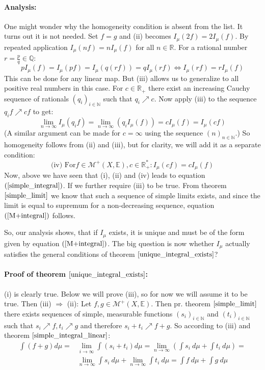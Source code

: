 \documentclass[12pt, a4paper]{article}
\numberwithin{equation}{section}
\begin{document}
\paragraph{Analysis:}
One might wonder why the homogeneity condition is absent from the list. It turns out it is not needed. Set $f=g$ and (ii) becomes $I_\mu(2f)=2 I_\mu(f)$. By repeated application $I_\mu(nf)=n I_\mu(f)$ for all $n\in\mathbb{R}$. For a rational number $r=\frac{p}{q}\in\mathbb{Q}$:
\begin{equation}
p I_\mu(f)=I_\mu(pf)=I_\mu(q(rf))=q I_\mu(rf)\Leftrightarrow I_\mu(rf)=r I_\mu(f)
\end{equation}
This can be done for any linear map. But (iii) allows us to generalize to all positive real numbers in this case. For $c\in\mathbb{R}_+$ there exist an increasing Cauchy sequence of rationals $(q_i)_{i\in\mathbb{N}}$ such that $q_i\nearrow c$. Now apply (iii) to the sequence $q_i f\nearrow c f$ to get:
\begin{equation}
\lim_{n\rightarrow\infty}I_\mu(q_i f)=\lim_{n\rightarrow\infty}\left(q_i I_\mu(f)\right)=c I_\mu(f)=I_\mu(c f)
\end{equation}
(A similar argument can be made for $c=\infty$ using the sequence $(n)_{n\in\mathbb{N}}$.) So homogeneity follows from (ii) and (iii), but for clarity, we will add it as a separate condition:
\begin{equation}
\label{lebesgue_integral_homogeneity}
\textrm{(iv) For} f\in\mathcal{M}^+(X,\mathbb{E}), c\in\mathbb{R}^*_+: I_\mu(c f)=c I_\mu(f)
\end{equation}
Now, above we have seen that (i), (ii) and (iv) leads to equation $(\ref{simple_integral})$. If we further require (iii) to be true. From theorem $\ref{simple_limit}$ we know that such a sequence of simple limits exists, and since the limit is equal to supremum for a non-decreasing sequence, equation $(\ref{M+integral})$ follows.

So, our analysis shows, that if $I_\mu$ exists, it is unique and must be of the form given by equation $(\ref{M+integral})$. The big question is now whether $I_\mu$ actually satisfies the general conditions of theorem $\ref{unique_integral_exists}$?

\paragraph{Proof of theorem $\ref{unique_integral_exists}$:}
(i) is clearly true. Below we will prove (iii), so for now we will assume it to be true. Then (iii) $\Rightarrow$ (ii): Let $f,g\in\mathcal{M}^+(X,\mathbb{E})$. Then pr. theorem $\ref{simple_limit}$ there exists sequences of simple, measurable functions $(s_i)_{i\in\mathbb{N}}$ and $(t_i)_{i\in\mathbb{N}}$ such that $s_i\nearrow f, t_i\nearrow g$ and therefore $s_i+t_i\nearrow f+g$. So according to (iii) and theorem $\ref{simple_integral_linear}$:
\begin{align}
\int(f+g)d\mu=&\underset{i\rightarrow\infty}{\lim}\int(s_i+t_i)d\mu=\lim_{n\rightarrow\infty}\left(\int s_i\ d\mu+\int t_i\ d\mu\right)=\\
&\lim_{n\rightarrow\infty}\int s_i\ d\mu+\lim_{n\rightarrow\infty}\int t_i\ d\mu=\int f\ d\mu+\int g\ d\mu
\end{align}
\end{document}

